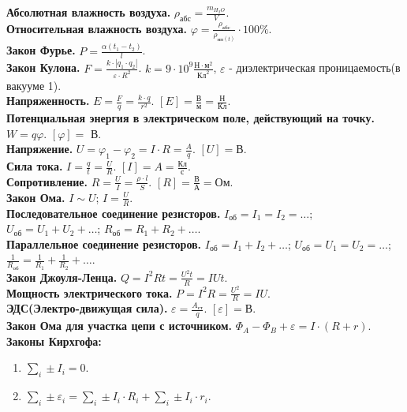\documentclass{article}
\begin{document}
	\textbf{Абсолютная влажность воздуха.} $\rho_{\text{абс}} = \frac{m_{H_2O}}{V}$. \\
	\textbf{Относительная влажность воздуха.} $\varphi = \frac{\rho_{\text{абс}}}{\rho_{\text{нп}(t)}} \cdot 100\%$. \\
	\textbf{Закон Фурье.} $P = \frac{\alpha (t_1 - t_2)}{l}$. \\
	\textbf{Закон Кулона.} $F = \frac{k \cdot |q_{1} \cdot q_{2}|}{\varepsilon \cdot R^{2}}$. $k = 9 \cdot 10^{9} \frac{\text{Н} \cdot \text{м}^{2}}{\text{Кл}^{2}}$, $\varepsilon$ - диэлектрическая проницаемость(в вакууме 1). \\
	\textbf{Напряженность.} $E = \frac{F}{q} = \frac{k \cdot q}{r^{2}}$. $[E] = \frac{\text{В}}{\text{м}} = \frac{\text{Н}}{\text{Кл}}$. \\
	\textbf{Потенциальная энергия в электрическом поле, действующий на точку.} $W = q \varphi$. $[\varphi] =$ В. \\
	\textbf{Напряжение.} $U = \varphi_{1} - \varphi_{2} = I \cdot R = \frac{A}{q}$. $[U] = \text{В}$. \\
	\textbf{Сила тока.} $I = \frac{q}{t} = \frac{U}{R}$. $[I] = A = \frac{\text{Кл}}{\text{с}}$. \\
	\textbf{Сопротивление.} $R = \frac{U}{I} = \frac{\rho \cdot l}{S}$. $[R] = \frac{\text{В}}{\text{А}} = \text{Ом}$. \\
	\textbf{Закон Ома.} $I \sim U$; $I = \frac{U}{R}$. \\
	\textbf{Последовательное соединение резисторов.} $I_{\text{об}} = I_{1} = I_{2} = \dots$; $U_{\text{об}} = U_{1} + U_{2} + \dots$; $R_{\text{об}} = R_{1} + R_{2} + \dots$. \\
	\textbf{Параллельное соединение резисторов.} $I_{\text{об}} = I_{1} + I_{2} + \dots$; $U_{\text{об}} = U_{1} = U_{2} = \dots$; $\frac{1}{R_{\text{об}}} = \frac{1}{R_{1}} + \frac{1}{R_{2}} + \dots$. \\
	\textbf{Закон Джоуля-Ленца.} $Q = I^2Rt = \frac{U^2t}{R} = IUt$. \\
	\textbf{Мощность электрического тока.} $P = I^2R = \frac{U^2}{R} = IU$. \\
	\textbf{ЭДС(Электро-движущая сила).} $\varepsilon = \frac{A_{\text{ст}}}{q}$. $[\varepsilon] = \text{В}$. \\
	\textbf{Закон Ома для участка цепи с источником.} $\Phi_{A} - \Phi_{B} + \varepsilon = I \cdot (R + r)$. \\
	\textbf{Законы Кирхгофа:}
	\begin{enumerate}
		\item $\sum \limits_{i} \pm I_{i} = 0$.
		\item $\sum \limits_{i} \pm \varepsilon_{i} = \sum \limits_{i} \pm I_{i} \cdot R_{i} + \sum \limits_{i} \pm I_{i} \cdot r_{i}$.
	\end{enumerate}
\end{document}
